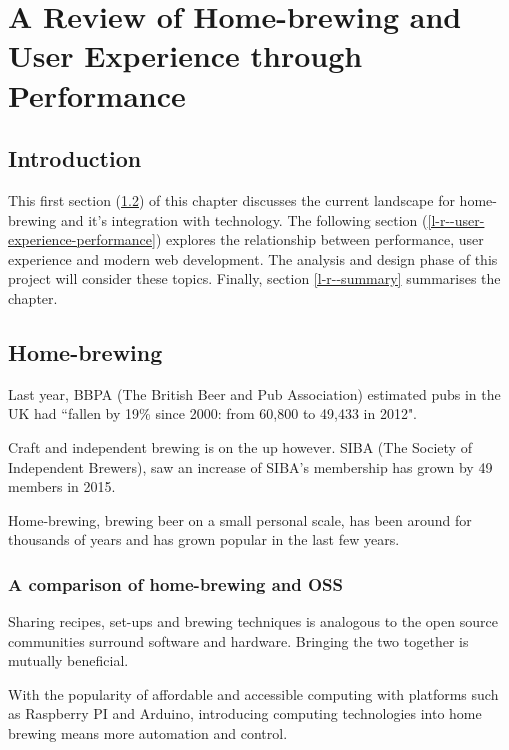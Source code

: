 \chapter{A Review of Home-brewing and User Experience through Performance} \label{l-r}

\section{Introduction} \label{l-r--introduction}

This first section (\ref{l-r--home-brewing}) of this chapter discusses the current landscape for home-brewing and it's integration with technology. The following section (\ref{l-r--user-experience-performance}) explores the relationship between performance, user experience and modern web development. The analysis and design phase of this project will consider these topics. Finally, section \ref{l-r--summary} summarises the chapter.

\section{Home-brewing} \label{l-r--home-brewing}

Last year, BBPA (The British Beer and Pub Association) estimated pubs in the UK had ``fallen by 19\% since 2000: from 60,800 to 49,433 in 2012". \cite{BBPA}

Craft and independent brewing is on the up however. SIBA (The Society of Independent Brewers), saw an increase of  SIBA’s membership has grown by 49 members in 2015. \cite{SIBA}

Home-brewing, brewing beer on a small personal scale, has been around for thousands of years and has grown popular in the last few years. %


\subsection{A comparison of home-brewing and OSS} \label{l-r--compare-home-brewing-and-oss}

Sharing recipes, set-ups and brewing techniques is analogous to the open source communities surround software and hardware. Bringing the two together is mutually beneficial.

With the popularity of affordable and accessible computing with platforms such as Raspberry PI and Arduino, introducing computing technologies into home brewing means more automation and control.


